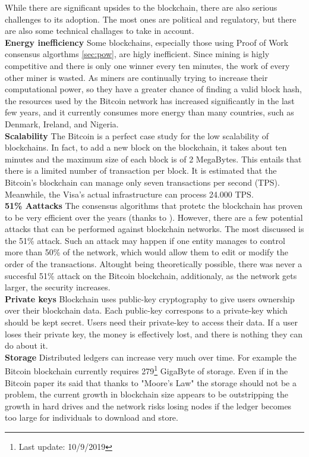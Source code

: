 While there are significant upsides to the blockchain, there are also serious 
challenges to its adoption. The most ones are political and regulatory, but 
there are also some technical challages to take in account.
\bigskip\\
\textbf{Energy inefficiency}
Some blockchains, especially those using Proof of Work consensus algorthms \ref{sec:pow}, are 
higly inefficient. Since mining is higly competitive and there is 
only one winner every ten minutes, the work of every other miner is wasted.
As miners are continually trying to increase their computational power, 
so they have a greater chance of finding a valid block hash, the resources used 
by the Bitcoin network has increased significantly in the last few years, and it 
currently consumes more energy than many countries, such as Denmark, Ireland, 
and Nigeria.\cite{binancevision}
\bigskip\\
\textbf{Scalability}
The Bitcoin is a perfect case study for the low scalability of blockchains.
In fact, to add a new block on the blockchain, it takes about ten minutes and
the maximum size of each block is of 2 MegaBytes. This entails that there is a
limited number of transaction per block. It is estimated that the Bitcoin's 
blockchain can manage only seven transactions per second (TPS). Meanwhile, the
Visa's actual infrastructure can process 24.000 TPS.
\bigskip\\
\textbf{51\% Aattacks}
The consensus algorithms that protetc the blockchain has proven to be very 
efficient over the years (thanks to ). However, there are a few potential attacks that can 
be performed against blockchain networks. The most discussed is the  51\% attack.
Such an attack may happen if one entity manages to control more than 50\% of the 
network, which would allow them to edit or modify the order of the transactions.
Altought being theoretically possible, there was never a succesful 51\% attack on 
the Bitcoin blockchain, additionaly, as the network gets larger, the security 
increases.\cite{binancevision}
\bigskip\\
\textbf{Private keys} 
Blockchain uses public-key cryptography to give users ownership over their blockchain data.
Each public-key correspons to a private-key which should be kept secret. Users need their 
private-key to access their data. If a user loses their private key, the money is 
effectively lost, and there is nothing they can do about it.\cite{binancevision}
\bigskip\\
\textbf{Storage}
Distributed ledgers can increase very much over time. For example the Bitcoin blockchain
currently requires 279\footnote{Last update: 10/9/2019} GigaByte of storage. Even if in 
the Bitcoin paper its said that thanks to "Moore's Law"\cite{bitcoin} the storage should
not be a problem, the current growth in blockchain size appears to be outstripping the growth
in hard drives and the network risks losing nodes if the ledger becomes too large for 
individuals to download and store.\cite{binancevision}
